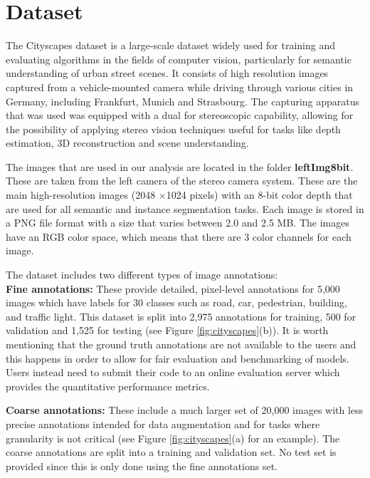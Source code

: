 \section{Dataset}

The Cityscapes dataset is a large-scale dataset widely used for training and evaluating algorithms in the fields of computer vision, particularly for semantic understanding of urban street scenes. It consists of high resolution images captured from a vehicle-mounted camera while driving through various cities in Germany, including Frankfurt, Munich and Strasbourg. The capturing apparatus that was used was equipped with a dual for stereoscopic capability, allowing for the possibility of applying stereo vision techniques useful for tasks like depth estimation, 3D reconstruction and scene understanding. 

The images that are used in our analysis are located in the folder \textbf{leftImg8bit}. These are taken from the left camera of the stereo camera system. These are the main high-resolution images (2048 $\times$1024 pixels) with an 8-bit color depth that are used for all semantic and instance segmentation tasks. Each image is stored in a PNG file format with a size that varies between 2.0 and 2.5 MB. The images have an RGB color space, which means that there are 3 color channels for each image.

The dataset includes two different types of image annotations:\\
\textbf{Fine annotations:} These provide detailed, pixel-level annotations for 5,000 images which have labels for 30 classes such as road, car, pedestrian, building, and traffic light. This dataset is split into 2,975 annotations for training, 500 for validation and 1,525 for testing (see Figure \ref{fig:cityscapes}(b)). It is worth mentioning that the ground truth annotations are not available to the users and this happens in order to allow for fair evaluation and benchmarking of models. Users instead need to submit their code to an online evaluation server which provides the quantitative performance metrics.    

\textbf{Coarse annotations:} These include a much larger set of 20,000 images with less precise annotations intended for data augmentation and for tasks where granularity is not critical (see Figure \ref{fig:cityscapes}(a) for an example). The coarse annotations are split into a training and validation set. No test set is provided since this is only done using the fine annotations set. 

